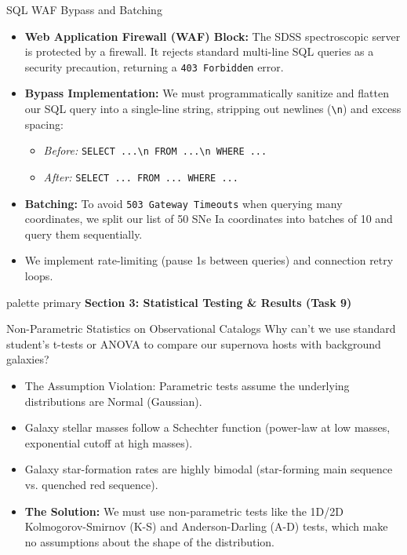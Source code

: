 \documentclass[9pt]{beamer}
\begin{document}
\begin{frame}{SQL WAF Bypass and Batching}
  \begin{itemize}
    \item \textbf{Web Application Firewall (WAF) Block:}
      The SDSS spectroscopic server is protected by a firewall. It rejects standard multi-line SQL queries as a security precaution, returning a \texttt{403 Forbidden} error.
    \item \textbf{Bypass Implementation:}
      We must programmatically sanitize and flatten our SQL query into a single-line string, stripping out newlines (\texttt{\textbackslash n}) and excess spacing:
      \begin{itemize}
        \item \textit{Before:} \texttt{SELECT ...\textbackslash n FROM ...\textbackslash n WHERE ...}
        \item \textit{After:} \texttt{SELECT ... FROM ... WHERE ...}
      \end{itemize}
    \item \textbf{Batching:}
      To avoid \texttt{503 Gateway Timeouts} when querying many coordinates, we split our list of 50 SNe Ia coordinates into batches of 10 and query them sequentially.
    \item We implement rate-limiting (pause 1s between queries) and connection retry loops.
  \end{itemize}
\end{frame}

\begin{frame}[plain]
  \vfill
  \centering
  \begin{beamercolorbox}[sep=8pt,center,shadow=true,rounded=true]{palette primary}
    \textbf{Section 3: Statistical Testing \& Results (Task 9)}
  \end{beamercolorbox}
  \vfill
\end{frame}

\begin{frame}{Non-Parametric Statistics on Observational Catalogs}
  Why can't we use standard student's t-tests or ANOVA to compare our supernova hosts with background galaxies?
  \begin{itemize}
    \item \alert{The Assumption Violation:}
      Parametric tests assume the underlying distributions are Normal (Gaussian).
    \item Galaxy stellar masses follow a Schechter function (power-law at low masses, exponential cutoff at high masses).
    \item Galaxy star-formation rates are highly bimodal (star-forming main sequence vs. quenched red sequence).
    \item \textbf{The Solution:} We must use non-parametric tests like the 1D/2D Kolmogorov-Smirnov (K-S) and Anderson-Darling (A-D) tests, which make no assumptions about the shape of the distribution.
  \end{itemize}
\end{frame}
\end{document}
